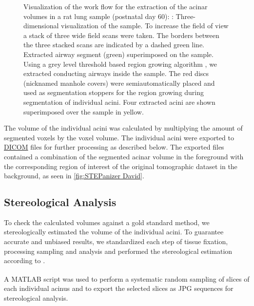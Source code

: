 \documentclass[a4paper,DIV=calc,abstract,english]{scrartcl}
\newlength\imagescale		%
\begin{document}
\begin{figure}
{\begin{tikzpicture}[x=\imagescale,y=-\imagescale]
		\end{tikzpicture}%
		\label{subfig:extracted acini}%
		}%
	\caption{%
		Visualization of the work flow for the extraction of the acinar volumes in a rat lung sample (postnatal day 60): %
		\protect{}: Three-dimensional visualization of the sample.
		To increase the field of view  a stack of three wide field scans were taken.
		The borders between the three stacked scans are indicated by a dashed green line. 
		\protect{} Extracted airway segment (green) superimposed on the sample.
		Using a grey level threshold based region growing algorithm , we extracted conducting airways inside the sample.
		The red discs (nicknamed manhole covers) were semiautomatically placed and used as segmentation stoppers for the region growing during segmentation of individual acini.
		\protect{} Four extracted acini are shown superimposed over the sample in yellow.
	}
	\label{fig:workflow}
\end{figure}

The volume of the individual acini was calculated by multiplying the amount of segmented voxels by the voxel volume.
The individual acini were exported to \href{https://secure.wikimedia.org/wikipedia/en/w/index.php?title=Digital_Imaging_and_Communications_in_Medicine&oldid=415023605}{DICOM} files for further processing as described below.
The exported files contained a combination of the segmented acinar volume in the foreground with the corresponding region of interest of the original tomographic dataset in the background, as seen in \autoref{fig:STEPanizer David}.

\subsection{Stereological Analysis}
To check the calculated volumes against a gold standard method, we stereologically estimated the volume of the individual acini.
To guarantee accurate and unbiased results, we standardized each step of tissue fixation, processing sampling and analysis and performed the stereological estimation according to \citet{Hsia2010}.

A MATLAB\textsuperscript{\textregistered} script was used to perform a systematic random sampling of slices of each individual acinus and to export the selected slices as JPG sequences for stereological analysis.
\end{document}
